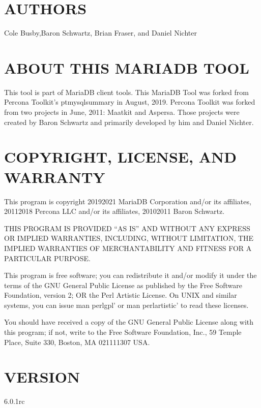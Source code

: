 \documentclass[letterpaper,10pt,english]{sphinxmanual}
\begin{document}
\section{AUTHORS}
\label{\detokenize{mariadb-database-summary:authors}}
\sphinxAtStartPar
Cole Busby,Baron Schwartz, Brian Fraser, and Daniel Nichter


\section{ABOUT THIS MARIADB TOOL}
\label{\detokenize{mariadb-database-summary:about-this-mariadb-tool}}
\sphinxAtStartPar
This tool is part of MariaDB client tools. This MariaDB Tool was forked from
Percona Toolkit’s pt\sphinxhyphen{}mysql\sphinxhyphen{}summary in August, 2019. Percona Toolkit was forked
from two projects in June, 2011: Maatkit and Aspersa.  Those projects were
created by Baron Schwartz and primarily developed by him and Daniel Nichter.


\section{COPYRIGHT, LICENSE, AND WARRANTY}
\label{\detokenize{mariadb-database-summary:copyright-license-and-warranty}}
\sphinxAtStartPar
This program is copyright 2019\sphinxhyphen{}2021 MariaDB Corporation and/or its affiliates,
2011\sphinxhyphen{}2018 Percona LLC and/or its affiliates, 2010\sphinxhyphen{}2011 Baron Schwartz.

\sphinxAtStartPar
THIS PROGRAM IS PROVIDED “AS IS” AND WITHOUT ANY EXPRESS OR IMPLIED
WARRANTIES, INCLUDING, WITHOUT LIMITATION, THE IMPLIED WARRANTIES OF
MERCHANTABILITY AND FITNESS FOR A PARTICULAR PURPOSE.

\sphinxAtStartPar
This program is free software; you can redistribute it and/or modify it under
the terms of the GNU General Public License as published by the Free Software
Foundation, version 2; OR the Perl Artistic License.  On UNIX and similar
systems, you can issue \textasciigrave{}man perlgpl’ or \textasciigrave{}man perlartistic’ to read these
licenses.

\sphinxAtStartPar
You should have received a copy of the GNU General Public License along with
this program; if not, write to the Free Software Foundation, Inc., 59 Temple
Place, Suite 330, Boston, MA  02111\sphinxhyphen{}1307  USA.


\section{VERSION}
\label{\detokenize{mariadb-database-summary:version}}
\sphinxAtStartPar
{} 6.0.1rc
\end{document}
